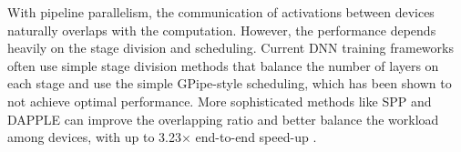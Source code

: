 \documentclass[a4paper, 11pt]{article}
\begin{document}
    With pipeline parallelism, the communication of activations between devices naturally overlaps with the computation.
    However, the performance depends heavily on the stage division and scheduling. Current DNN training frameworks often
    use simple stage division methods that balance the number of layers on each stage and use the simple GPipe-style
    \cite{gpipe} scheduling, which has been shown to not achieve optimal performance. More sophisticated methods like
    SPP \cite{spp} and DAPPLE \cite{dapple} can improve the overlapping ratio and better balance the workload among
    devices, with up to 3.23$\times$ end-to-end speed-up \cite{dapple}.

    
    
\end{document}
